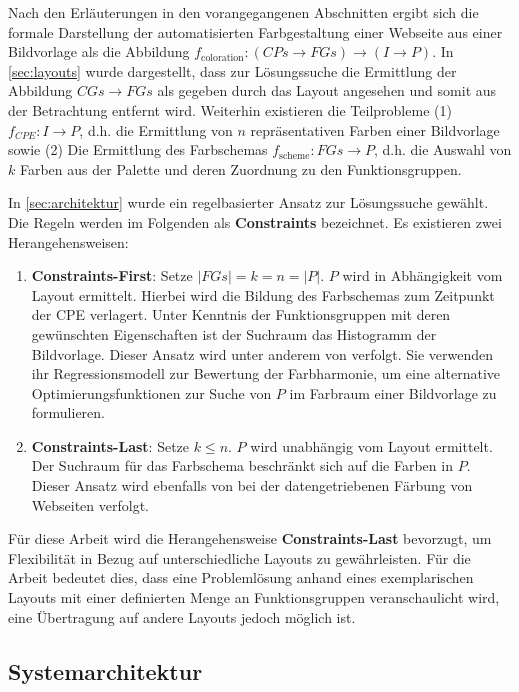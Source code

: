 Nach den Erläuterungen in den vorangegangenen Abschnitten ergibt sich die formale Darstellung der automatisierten Farbgestaltung einer Webseite aus einer Bildvorlage als die Abbildung $f_\text{coloration}: (CPs \to FGs) \to (I \to P)$. In \autoref{sec:layouts} wurde dargestellt, dass zur Lösungssuche die Ermittlung der Abbildung $CGs \to FGs$ als gegeben durch das Layout angesehen und somit aus der Betrachtung entfernt wird. Weiterhin existieren die Teilprobleme (1) $f_{CPE}: I \to P$, d.h. die Ermittlung von $n$ repräsentativen Farben einer Bildvorlage sowie (2) Die Ermittlung des Farbschemas $f_\text{scheme}: FGs \to P$, d.h. die Auswahl von $k$ Farben aus der Palette und deren Zuordnung zu den Funktionsgruppen.

In \autoref{sec:architektur} wurde ein regelbasierter Ansatz zur Lösungssuche gewählt. Die Regeln werden im Folgenden als \textbf{Constraints} bezeichnet. Es existieren zwei Herangehensweisen:
\begin{enumerate}
    \item \textbf{Constraints-First}: Setze $|FGs| = k = n = |P|$. $P$ wird in Abhängigkeit vom Layout ermittelt. Hierbei wird die Bildung des Farbschemas zum Zeitpunkt der CPE verlagert. Unter Kenntnis der Funktionsgruppen mit deren gewünschten Eigenschaften ist der Suchraum das Histogramm der Bildvorlage. Dieser Ansatz wird unter anderem von \citet{colorcomp} verfolgt. Sie verwenden ihr Regressionsmodell zur Bewertung der Farbharmonie, um eine alternative Optimierungsfunktionen zur Suche von $P$ im Farbraum einer Bildvorlage zu formulieren.
    \item \textbf{Constraints-Last}: Setze $k \leq n$. $P$ wird unabhängig vom Layout ermittelt. Der Suchraum für das Farbschema beschränkt sich auf die Farben in $P$. Dieser Ansatz wird ebenfalls von \citep{webpage} bei der datengetriebenen Färbung von Webseiten verfolgt.
\end{enumerate}

Für diese Arbeit wird die Herangehensweise \textbf{Constraints-Last} bevorzugt, um Flexibilität in Bezug auf unterschiedliche Layouts zu gewährleisten. Für die Arbeit bedeutet dies, dass eine Problemlösung anhand eines exemplarischen Layouts mit einer definierten Menge an Funktionsgruppen veranschaulicht wird, eine Übertragung auf andere Layouts jedoch möglich ist.

\subsection{Systemarchitektur}
\label{sec:architektur}

